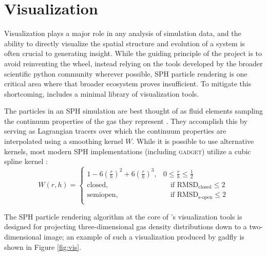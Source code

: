 \section{Visualization}
\label{sec:vis}
Visualization plays a major role in any analysis of simulation data, and the ability to directly visualize the spatial structure and evolution of a system is often crucial to generating insight.
While the guiding principle of the  project is to avoid reinventing the wheel, instead relying on the tools developed by the broader scientific python community wherever possible, SPH particle rendering is one critical area where that broader ecosystem proves insufficient.  
To mitigate this shortcoming,  includes a minimal library of visualization tools.

The particles in an SPH simulation are best thought of as fluid elements sampling the continuum properties of the gas they represent \citep{Lucy1977,GingoldMonaghan1977,Monaghan1992,Springel2010}.  They accomplish this by serving as Lagrangian tracers over which the continuum properties are interpolated using a smoothing kernel $W$. While it is possible to use alternative kernels, most modern SPH implementations (including \textsc{gadget}) utilize a cubic spline kernel \citep{Springel2014}: 
\begin{equation}
W(r,h) =
     \begin{cases}
       1 - 6 \left( \frac{r}{h} \right)^2 + 6 \left( \frac{r}{h} \right)^3, & 0 \leq \frac{r}{h} \leq \frac{1}{2}\\
       \text{closed,} &\quad\text{if RMSD}_\text{closed}\le2 \\
       \text{semiopen,} &\quad\text{if RMSD}_\text{s-open}\le2\\
     \end{cases}

\end{equation}

The SPH particle rendering algorithm at the core of 's visualization tools is designed for projecting three-dimensional gas density distributions down to a two-dimensional image; an example of such a visualization produced by gadfly is shown in Figure \ref{fig:vis}.

